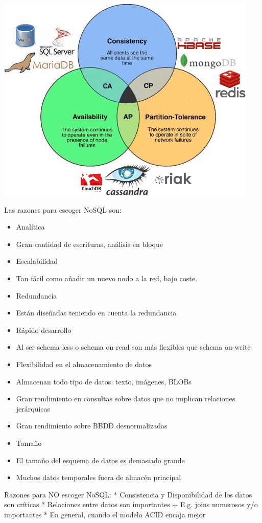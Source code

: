 \documentclass[
]{book}
\providecommand{\tightlist}{%
  \setlength{\itemsep}{0pt}\setlength{\parskip}{0pt}}
\begin{document}
\includegraphics{images/TeoremaCAP.jpg}

Las razones para escoger NoSQL son:

\begin{itemize}
\tightlist
\item
  Analítica
\item
  Gran cantidad de escrituras, análisis en bloque
\item
  Escalabilidad
\item
  Tan fácil como añadir un nuevo nodo a la red, bajo coste.
\item
  Redundancia
\item
  Están diseñadas teniendo en cuenta la redundancia
\item
  Rápido desarrollo
\item
  Al ser schema-less o schema on-read son más flexibles que schema on-write
\item
  Flexibilidad en el almacenamiento de datos
\item
  Almacenan todo tipo de datos: texto, imágenes, BLOBs
\item
  Gran rendimiento en consultas sobre datos que no implican relaciones jerárquicas
\item
  Gran rendimiento sobre BBDD desnormalizadas
\item
  Tamaño
\item
  El tamaño del esquema de datos es demasiado grande
\item
  Muchos datos temporales fuera de almacén principal
\end{itemize}

Razones para NO escoger NoSQL:
* Consistencia y Disponibilidad de los datos son críticas
* Relaciones entre datos son importantes
+ E.g. joins numerosos y/o importantes
* En general, cuando el modelo ACID encaja mejor
\end{document}
